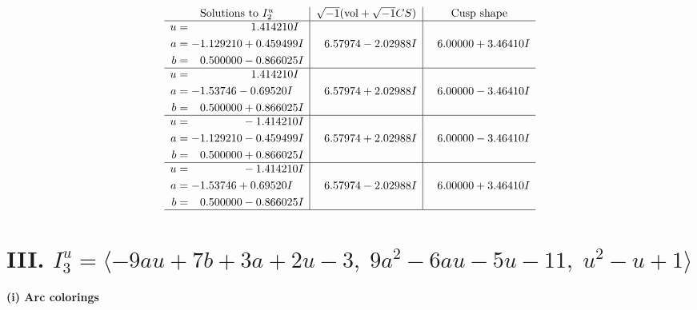 \documentclass[1p]{elsarticle_modified}
\theoremstyle{definition}
\newcommand{\I}{\sqrt{-1}}
\begin{document}
$$\begin{array}{c|c|c}  
\text{Solutions to }I^u_{2}& \I (\text{vol} + \sqrt{-1}CS) & \text{Cusp shape}\\
 \hline 
\begin{aligned}
u &= \phantom{-0.000000 -}1.414210 I \\
a &= -1.129210 + 0.459499 I \\
b &= \phantom{-}0.500000 - 0.866025 I\end{aligned}
 & \phantom{-}6.57974 - 2.02988 I & \phantom{-}6.00000 + 3.46410 I \\ \hline\begin{aligned}
u &= \phantom{-0.000000 -}1.414210 I \\
a &= -1.53746 - 0.69520 I \\
b &= \phantom{-}0.500000 + 0.866025 I\end{aligned}
 & \phantom{-}6.57974 + 2.02988 I & \phantom{-}6.00000 - 3.46410 I \\ \hline\begin{aligned}
u &= \phantom{-0.000000 } -1.414210 I \\
a &= -1.129210 - 0.459499 I \\
b &= \phantom{-}0.500000 + 0.866025 I\end{aligned}
 & \phantom{-}6.57974 + 2.02988 I & \phantom{-}6.00000 - 3.46410 I \\ \hline\begin{aligned}
u &= \phantom{-0.000000 } -1.414210 I \\
a &= -1.53746 + 0.69520 I \\
b &= \phantom{-}0.500000 - 0.866025 I\end{aligned}
 & \phantom{-}6.57974 - 2.02988 I & \phantom{-}6.00000 + 3.46410 I\\
 \hline 
 \end{array}$$\newpage\newpage\renewcommand{\arraystretch}{1}
\centering \section*{III. $I^u_{3}= \langle -9 a u+7 b+3 a+2 u-3,\;9 a^2-6 a u-5 u-11,\;u^2- u+1 \rangle$}
\flushleft \textbf{(i) Arc colorings}\\
\end{document}
